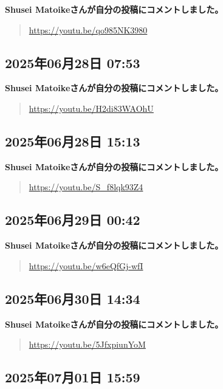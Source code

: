 \textbf{Shusei Matoikeさんが自分の投稿にコメントしました。}

\begin{quote}
\url{https://youtu.be/qo985NK3980}
\end{quote}

\subsection*{2025年06月28日 07:53}

\textbf{Shusei Matoikeさんが自分の投稿にコメントしました。}

\begin{quote}
\url{https://youtu.be/H2di83WAOhU}
\end{quote}

\subsection*{2025年06月28日 15:13}

\textbf{Shusei Matoikeさんが自分の投稿にコメントしました。}

\begin{quote}
\url{https://youtu.be/S_f8lqk93Z4}
\end{quote}

\subsection*{2025年06月29日 00:42}

\textbf{Shusei Matoikeさんが自分の投稿にコメントしました。}

\begin{quote}
\url{https://youtu.be/w6eQfGj-wfI}
\end{quote}

\subsection*{2025年06月30日 14:34}

\textbf{Shusei Matoikeさんが自分の投稿にコメントしました。}

\begin{quote}
\url{https://youtu.be/5JfxpiunYoM}
\end{quote}

\subsection*{2025年07月01日 15:59}

